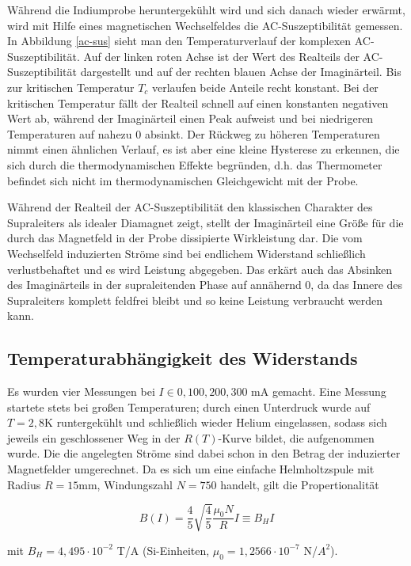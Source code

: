 Während die Indiumprobe heruntergekühlt wird und sich danach wieder erwärmt, wird mit Hilfe eines magnetischen Wechselfeldes die AC-Suszeptibilität gemessen. In Abbildung \ref{ac-sus} sieht man den Temperaturverlauf der komplexen AC-Suszeptibilität. Auf der linken roten Achse ist der Wert des Realteils der AC-Suszeptibilität dargestellt und auf der rechten blauen Achse der Imaginärteil. Bis zur kritischen Temperatur $T_c$ verlaufen beide Anteile recht konstant. Bei der kritischen Temperatur fällt der Realteil schnell auf einen konstanten negativen Wert ab, während der Imaginärteil einen Peak aufweist und bei niedrigeren Temperaturen auf nahezu 0 absinkt. Der Rückweg zu höheren Temperaturen nimmt einen ähnlichen Verlauf, es ist aber eine kleine Hysterese zu erkennen, die sich durch die thermodynamischen Effekte begründen, d.h. das Thermometer befindet sich nicht im thermodynamischen Gleichgewicht mit der Probe.

Während der Realteil der AC-Suszeptibilität den klassischen Charakter des Supraleiters als idealer Diamagnet zeigt, stellt der Imaginärteil eine Größe für die durch das Magnetfeld in der Probe dissipierte Wirkleistung dar. Die vom Wechselfeld induzierten Ströme sind bei endlichem Widerstand schließlich verlustbehaftet und es wird Leistung abgegeben. Das erkärt auch das Absinken des Imaginärteils in der supraleitenden Phase auf annähernd 0, da das Innere des Supraleiters komplett feldfrei bleibt und so keine Leistung verbraucht werden kann.

\subsection{Temperaturabhängigkeit des Widerstands}
Es wurden vier Messungen bei $I \in {0,100,200,300}$ mA gemacht. Eine Messung startete stets bei großen Temperaturen; durch einen Unterdruck wurde auf $T=2,8$K runtergekühlt und schließlich wieder Helium eingelassen, sodass sich jeweils ein geschlossener Weg in der $R(T)$-Kurve bildet, die aufgenommen wurde. Die die angelegten Ströme sind dabei schon in den Betrag der induzierter Magnetfelder umgerechnet. Da es sich um eine einfache Helmholtzspule mit Radius $R=15$mm, Windungszahl $N=750$ handelt, gilt die Propertionalität

\begin{equation}
B(I) = \frac{4}{5}\sqrt{\frac{4}{5}} \frac{\mu_0 N}{R} I \equiv B_H I
\end{equation}

mit $B_H = 4,495 \cdot 10^{-2}$ T/A (Si-Einheiten, $\mu_0 = 1,2566\cdot 10^{-7}$ N/$A^2$).

